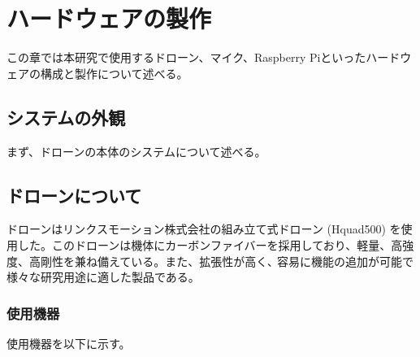 \hypertarget{ux30cfux30fcux30c9ux30a6ux30a7ux30a2ux306eux88fdux4f5c}{%
\section{ハードウェアの製作}\label{ux30cfux30fcux30c9ux30a6ux30a7ux30a2ux306eux88fdux4f5c}}

この章では本研究で使用するドローン、マイク、Raspberry
Piといったハードウェアの構成と製作について述べる。

\hypertarget{ux30b7ux30b9ux30c6ux30e0ux306eux5916ux89b3}{%
\subsection{システムの外観}\label{ux30b7ux30b9ux30c6ux30e0ux306eux5916ux89b3}}

まず、ドローンの本体のシステムについて述べる。

\hypertarget{ux30c9ux30edux30fcux30f3ux306bux3064ux3044ux3066}{%
\subsection{ドローンについて}\label{ux30c9ux30edux30fcux30f3ux306bux3064ux3044ux3066}}

ドローンはリンクスモーション株式会社の組み立て式ドローン (Hquad500)
を使用した。このドローンは機体にカーボンファイバーを採用しており、軽量、高強度、高剛性を兼ね備えている。また、拡張性が高く､
容易に機能の追加が可能で様々な研究用途に適した製品である。

\hypertarget{ux4f7fux7528ux6a5fux5668}{%
\subsubsection{使用機器}\label{ux4f7fux7528ux6a5fux5668}}

使用機器を以下に示す。

